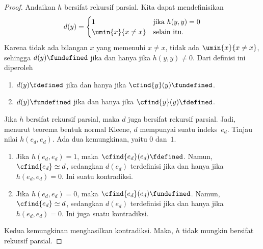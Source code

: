 \documentclass[../../../include/open-logic-section]{subfiles}
\begin{document}
\begin{proof}
Andaikan $h$ bersifat rekursif parsial. Kita dapat mendefinisikan
\[
d(y) =
\begin{cases}
1 & \text{jika $h(y, y) = 0$}\\
\umin{x}{x \neq x} & \text{selain itu.}
\end{cases}
\]
Karena tidak ada bilangan $x$ yang memenuhi $x\neq x$, tidak ada
$\umin{x}{x\neq x}$, sehingga $d(y)\fundefined$ jika dan hanya jika
$h(y,y)\neq0$. Dari definisi ini diperoleh
\begin{enumerate}
\item $d(y)\fdefined$ jika dan hanya jika
  $\cfind{y}(y)\fundefined$.
\item $d(y)\fundefined$ jika dan hanya jika
  $\cfind{y}(y)\fdefined$.
\end{enumerate}
Jika $h$ bersifat rekursif parsial, maka $d$ juga bersifat rekursif parsial.
Jadi, menurut teorema bentuk normal Kleene, $d$ mempunyai suatu indeks~$e_d$.
Tinjau nilai $h(e_d,e_d)$. Ada dua kemungkinan, yaitu $0$ dan~$1$.
\begin{enumerate}
\item Jika $h(e_d,e_d)=1$, maka $\cfind{e_d}(e_d)\fdefined$. Namun,
  $\cfind{e_d}\simeq d$, sedangkan $d(e_d)$ terdefinisi jika dan hanya jika
  $h(e_d,e_d)=0$. Ini suatu kontradiksi.
\item Jika $h(e_d,e_d)=0$, maka $\cfind{e_d}(e_d)\fundefined$. Namun,
  $\cfind{e_d}\simeq d$, sedangkan $d(e_d)$ terdefinisi jika dan hanya jika
  $h(e_d,e_d)=0$. Ini juga suatu kontradiksi.
\end{enumerate}
Kedua kemungkinan menghasilkan kontradiksi. Maka, $h$ tidak mungkin bersifat
rekursif parsial.
\end{proof}
\end{document}

